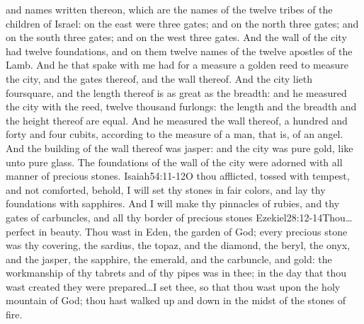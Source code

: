  and names written thereon, which are the names of the twelve tribes of the children of Israel:%
on the east were three gates; and on the north three gates; and on the south three gates; and on the west three gates.
And the wall of the city had twelve foundations, and on them twelve names of the twelve apostles of the Lamb. 
And he that spake with me had for a measure a golden reed to measure the city, and the gates thereof, and the wall thereof.%
And the city lieth foursquare, and the length thereof is as great as the breadth:%
and he measured the city with the reed, twelve thousand furlongs: the length and the breadth and the height thereof are equal.%
And he measured the wall thereof, a hundred and forty and four cubits, according to the measure of a man, that is, of an angel. 
And the building of the wall thereof was jasper: and the city was pure gold, like unto pure glass. 
The foundations of the wall of the city were adorned with all manner of precious stones.%
				{Isaiah}{54:11-12}{O thou afflicted, tossed with tempest, and not comforted, behold, I will set thy stones in fair colors, and lay thy foundations with sapphires. And I will make thy pinnacles of rubies, and thy gates of carbuncles, and all thy border of precious stones}%
				{Ezekiel}{28:12-14}{Thou\ldots perfect in beauty. Thou wast in Eden, the garden of God; every precious stone was thy covering, the sardius, the topaz, and the diamond, the beryl, the onyx, and the jasper, the sapphire, the emerald, and the carbuncle, and gold: the workmanship of thy tabrets and of thy pipes was in thee; in the day that thou wast created they were prepared\ldots I set thee, so that thou wast upon the holy mountain of God; thou hast walked up and down in the midst of the stones of fire.} %
